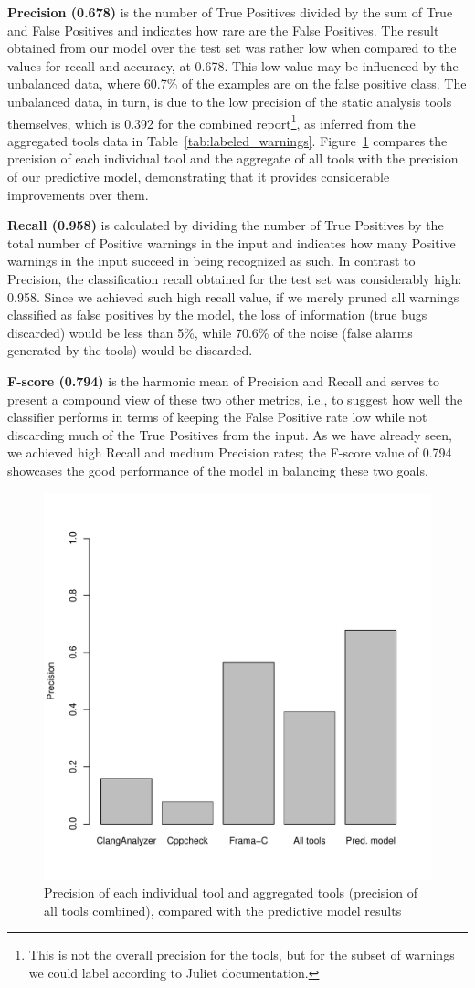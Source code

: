 \textbf{Precision (0.678)} is the number of True Positives divided
    by the sum of True and False Positives and indicates how rare are the
    False Positives. The result obtained from our model over the test set
    was rather low when compared to the values for recall and accuracy, at
    0.678. This low value may be influenced by the unbalanced data, where
    60.7\% of the examples are on the false positive class. The unbalanced
    data, in turn, is due to the low precision of the static analysis tools
    themselves, which is 0.392 for the combined report\footnote{This is not the
    overall precision for the tools, but for the subset of warnings we could
    label according to Juliet documentation.}, as inferred from the aggregated
    tools data in Table~\ref{tab:labeled_warnings}. Figure~\ref{fig:precisions}
    compares the precision of each individual tool and the aggregate of all tools with the precision
    of our predictive model, demonstrating that it provides considerable
    improvements over them.

\textbf{Recall (0.958)} is calculated by dividing the
    number of True Positives by the total number of Positive warnings
    in the input and indicates how many Positive
    warnings in the input succeed in being recognized as such. In contrast
    to Precision, the classification recall obtained
    for the test set was considerably high: 0.958. Since we achieved such
    high recall value, if we merely pruned all warnings classified as false positives by the model,
    the loss of information (true bugs discarded) would be less than 5\%, while
    70.6\% of the noise (false alarms generated by the tools) would be discarded.

\textbf{F-score (0.794)} is the harmonic mean of Precision and Recall and
serves to present a compound view of these two other metrics, i.e., to
suggest how well the classifier performs in terms of keeping the
False Positive rate low while not discarding much of the True Positives from
the input. As we have already seen, we achieved high Recall and medium
Precision rates; the F-score value of 0.794 showcases the good performance
of the model in balancing these two goals.


\begin{figure}
\centering
\includegraphics[width=.45\textwidth]{figures/precisions.pdf}
  \caption{Precision of each individual tool and aggregated tools (precision of all tools combined), compared with the predictive model results}\label{fig:precisions}
\end{figure}

